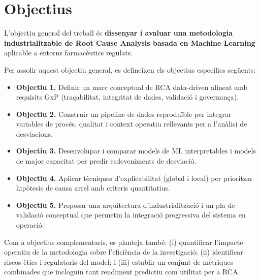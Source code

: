\section{Objectius}

L'objectiu general del treball és \textbf{dissenyar i avaluar una metodologia industrialitzable de Root Cause Analysis basada en Machine Learning} aplicable a entorns farmacèutics regulats.

Per assolir aquest objectiu general, es defineixen els objectius específics següents:

\begin{itemize}
  \item \textbf{Objectiu 1.} Definir un marc conceptual de RCA data-driven alineat amb requisits GxP (traçabilitat, integritat de dades, validació i governança).
  \item \textbf{Objectiu 2.} Construir un pipeline de dades reproduïble per integrar variables de procés, qualitat i context operatiu rellevants per a l'anàlisi de desviacions.
  \item \textbf{Objectiu 3.} Desenvolupar i comparar models de ML interpretables i models de major capacitat per predir esdeveniments de desviació.
  \item \textbf{Objectiu 4.} Aplicar tècniques d'explicabilitat (global i local) per prioritzar hipòtesis de causa arrel amb criteris quantitatius.
  \item \textbf{Objectiu 5.} Proposar una arquitectura d'industrialització i un pla de validació conceptual que permetin la integració progressiva del sistema en operació.
\end{itemize}

Com a objectius complementaris, es planteja també: (i) quantificar l'impacte operatiu de la metodologia sobre l'eficiència de la investigació; (ii) identificar riscos ètics i regulatoris del model; i (iii) establir un conjunt de mètriques combinades que incloguin tant rendiment predictiu com utilitat per a RCA.

